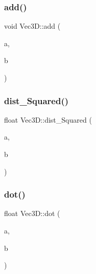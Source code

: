 \subsubsection{\texorpdfstring{add()}{add()}}
{\footnotesize\ttfamily void Vec3\+D\+::add (\begin{DoxyParamCaption}\item[{\mbox{\hyperlink{struct_vec3_d_1_1_vec3_d}{Vec3D}} $\ast$}]{a,  }\item[{const \mbox{\hyperlink{struct_vec3_d_1_1_vec3_d}{Vec3D}} $\ast$}]{b }\end{DoxyParamCaption})\hspace{0.3cm}{\ttfamily [inline]}}

\mbox{\label{namespace_vec3_d_ad12062de3bf351b2c29df9cddb496da2}} 
\subsubsection{\texorpdfstring{dist\+\_\+\+Squared()}{dist\_Squared()}}
{\footnotesize\ttfamily float Vec3\+D\+::dist\+\_\+\+Squared (\begin{DoxyParamCaption}\item[{const \mbox{\hyperlink{struct_vec3_d_1_1_vec3_d}{Vec3D}} $\ast$}]{a,  }\item[{const \mbox{\hyperlink{struct_vec3_d_1_1_vec3_d}{Vec3D}} $\ast$}]{b }\end{DoxyParamCaption})\hspace{0.3cm}{\ttfamily [inline]}}

\mbox{\label{namespace_vec3_d_a795e203692b186944d7ffabeef364c59}} 
\subsubsection{\texorpdfstring{dot()}{dot()}}
{\footnotesize\ttfamily float Vec3\+D\+::dot (\begin{DoxyParamCaption}\item[{const \mbox{\hyperlink{struct_vec3_d_1_1_vec3_d}{Vec3D}} $\ast$}]{a,  }\item[{const \mbox{\hyperlink{struct_vec3_d_1_1_vec3_d}{Vec3D}} $\ast$}]{b }\end{DoxyParamCaption})\hspace{0.3cm}{\ttfamily [inline]}}

